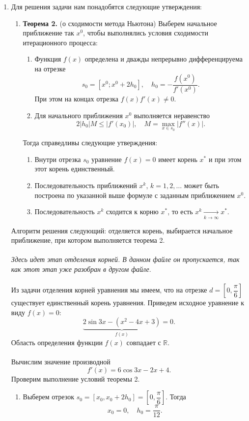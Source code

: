 \documentclass[a4paper, 12pt]{article}
\newcommand{\Rm}{\mathbb{R}}
\renewcommand{\leq}{\leqslant}
\begin{document}
\begin{enumerate}
		\newpage
		\item 
		\hypertarget{t4}{}
		Для решения задачи нам понадобятся следующие утверждения:
		\begin{enumerate}
			\item \textbf{Теорема 2.}
			(о сходимости метода Ньютона)
			Выберем начальное приближение так $x^0$, чтобы выполнялись условия сходимости итерационного процесса:
			\begin{enumerate}
				\item Функция $f(x)$ определена и дважды непрерывно дифференцируема на отрезке $$s_0 = [x^0; x^0 + 2h_0],\quad h_0 =- \dfrac{f(x^0)}{f'(x^0)}.$$ При этом на концах отрезка $f(x)f'(x)\ne 0$.
				\item Для начального приближения $x^0$ выполняется неравенство $$2|h_0|M \leq |f'(x_0)|,\quad M = \underset{x\in s_0}{\max}|f''(x)|.$$
			\end{enumerate}
			Тогда справедливы следующие утверждения:
			\begin{enumerate}
				\item Внутри отрезка $s_0$ уравнение $f(x) = 0$ имеет корень $x^*$ и при этом этот корень единственный.
				\item Последовательность приближений $x^k$, $k=1,2,\ldots$ может быть построена по указанной выше формуле с заданным приближением $x^0$.
				\item Последовательность $x^k$ сходится к корню $x^*$, то есть $x^k \xrightarrow[k\to\infty]{}x^*$.
			\end{enumerate} 
		\end{enumerate}
		Алгоритм решения следующий: отделяется корень, выбирается начальное приближение, при котором выполняется теорема 2.\\\\
		\textit{Здесь идет этап отделения корней. В данном файле он пропускается, так как этот этап уже разобран в другом файле}.\\\\
		Из задачи отделения корней уравнения мы имеем, что на отрезке $d = \left[0, \dfrac\pi6\right]$ существует единственный корень уравнения. Приведем исходное уравнение к виду $f(x) = 0$: $$\underbrace{2\sin 3x - (x^2 - 4x+3)}_{f(x)} = 0.$$
		Область определения функции $f(x)$ совпадает с $\Rm$.\\\\
		Вычислим значение производной $$f'(x) = 6\cos 3x - 2x +4.$$	
		Проверим выполнение условий теоремы 2.
		\begin{enumerate}
			\item Выберем отрезок $s_0 = [x_0, x_0 + 2h_0] = \left[0, \dfrac\pi6\right]$. Тогда $$x_0 = 0,\quad h_0 = \dfrac{\pi }{12}.$$

\end{enumerate}
\end{enumerate}
\end{document}
